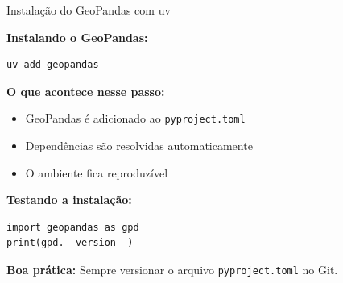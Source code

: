 \documentclass{beamer}
\begin{document}
\begin{frame}[fragile]{Instalação do GeoPandas com uv}
    
    \textbf{Instalando o GeoPandas:}
    
    \begin{verbatim}
uv add geopandas
    \end{verbatim}
    
    \vspace{0.3cm}
    
    \textbf{O que acontece nesse passo:}
    \begin{itemize}
        \item GeoPandas é adicionado ao \texttt{pyproject.toml}
        \item Dependências são resolvidas automaticamente
        \item O ambiente fica reproduzível
    \end{itemize}
    
    \vspace{0.3cm}
    
    \textbf{Testando a instalação:}
    
    \begin{verbatim}
import geopandas as gpd
print(gpd.__version__)
    \end{verbatim}
    
    \vspace{0.3cm}
    
    \textbf{Boa prática:}  
    Sempre versionar o arquivo \texttt{pyproject.toml} no Git.
    
\end{frame}
\end{document}

